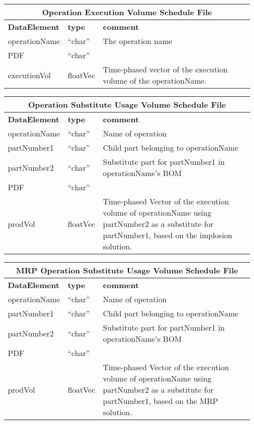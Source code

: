 \vspace{.5in}

\begin{tabular}{llp{4in}}
\multicolumn{3}{c}{{\bf Operation Execution Volume Schedule File}}\\ \hline\hline
{\bf DataElement} &  {\bf type}  &   {\bf comment} \\ \hline
operationName & ``char''  & The operation name \\
PDF        & ``char''  \\
executionVol  & floatVec&  Time-phased vector of the execution volume
  of the operationName.  
\end{tabular}

\vspace{.5in}

\begin{tabular}{llp{4in}}
\multicolumn{3}{c}{{\bf Operation Substitute Usage Volume Schedule File}}\\ \hline\hline
{\bf DataElement} &  {\bf type}  &   {\bf comment} \\ \hline
operationName & ``char''  & Name of operation\\
partNumber1 & ``char''  & Child part belonging to operationName\\
partNumber2 & ``char''  & Substitute part for partNumber1 in operationName's BOM\\
PDF        & ``char''  \\
prodVol    & floatVec &  Time-phased Vector of the execution volume of
                      operationName using partNumber2 as a substitute for
                      partNumber1, based on the implosion solution. \\
\end{tabular}

\vspace{.5in}
\begin{tabular}{llp{4in}}
\multicolumn{3}{c}{{\bf MRP Operation Substitute Usage Volume Schedule File}}\\ \hline\hline
{\bf DataElement} &  {\bf type}  &   {\bf comment} \\ \hline
operationName & ``char''  & Name of operation\\
partNumber1 & ``char''  & Child part belonging to operationName\\
partNumber2 & ``char''  & Substitute part for partNumber1 in operationName's BOM\\
PDF        & ``char''  \\
prodVol    & floatVec &  Time-phased Vector of the execution volume of
                      operationName using partNumber2 as a substitute for
                      partNumber1, based on the MRP solution. \\
\end{tabular}

